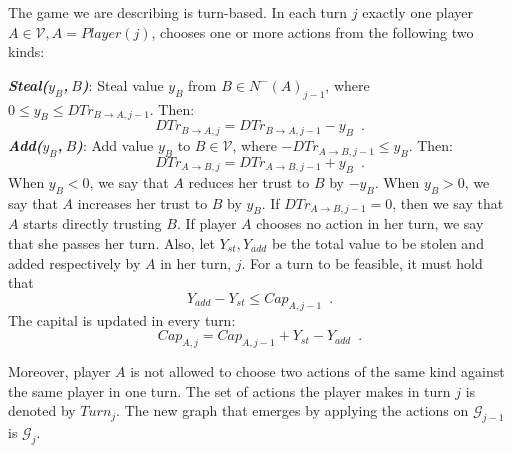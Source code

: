 {}
\begin{definition}[Turns]
  The game we are describing is turn-based. In each turn $j$ exactly one player $A \in \mathcal{V}, A =
  Player\left(j\right)$, chooses one or more actions from the following two kinds:

  \noindent \textit{\textbf{Steal($y_B$,$\:B$)}}: Steal value $y_B$ from $B \in N^{-}\left(A\right)_{j-1}$, where
  $0 \leq y_B \leq DTr_{B \rightarrow A, j-1}$. Then:
  \begin{equation*}
    DTr_{B \rightarrow A, j} = DTr_{B \rightarrow A, j-1} - y_B \enspace.
  \end{equation*}
  \noindent \textit{\textbf{Add($y_B$,$\:B$)}}:
  Add value $y_B$ to $B \in \mathcal{V}$, where $-DTr_{A \rightarrow B, j-1} \leq y_B$. Then:
  \begin{equation*}
    DTr_{A \rightarrow B, j} = DTr_{A \rightarrow B, j-1} + y_B \enspace.
  \end{equation*}
  When $y_B < 0$, we say that $A$ reduces her trust to $B$ by $-y_B$. When $y_B > 0$, we say that $A$ increases her
  trust to $B$ by $y_B$. If $DTr_{A \rightarrow B, j-1} = 0$, then we say that $A$ starts directly trusting $B$.
  If player $A$ chooses no action in her turn, we say that she passes her turn. Also, let $Y_{st}, Y_{add}$ be the
  total value to be stolen and added respectively by $A$ in her turn, $j$. For a turn to be feasible, it must hold that
  \begin{equation}
    Y_{add} - Y_{st} \leq Cap_{A, j-1} \enspace.
  \end{equation}
  The capital is updated in every turn:
  \begin{equation*}
    Cap_{A, j} = Cap_{A, j-1} + Y_{st} - Y_{add} \enspace.
  \end{equation*}

  Moreover, player $A$ is not allowed to choose two actions of the same kind against the same player in one turn.
  The set of actions the player makes in turn $j$ is denoted by $Turn_j$. The new graph that emerges by applying
  the actions on $\mathcal{G}_{j-1}$ is $\mathcal{G}_j$.
\end{definition}
